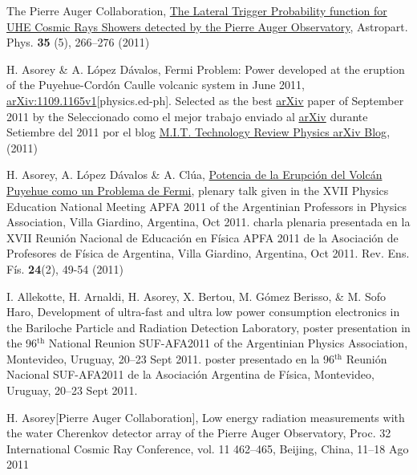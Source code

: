 \begin{etaremune}
\item {} The Pierre Auger Collaboration, 
\href{http://dx.doi.org/10.1016/j.astropartphys.2011.08.001}{{The Lateral
Trigger Probability function for UHE Cosmic Rays Showers detected by the Pierre
Auger Observatory}}, Astropart. Phys. {\bf{35}} (5), 266--276 (2011)

\item {}H. Asorey \& A. López Dávalos, {{Fermi Problem: Power
developed at the eruption of the Puyehue-Cordón Caulle volcanic system in June
2011}}, \href{http://arxiv.org/abs/1109.1165}{arXiv:1109.1165v1}[physics.ed-ph]. \ifeng
Selected as the best \href{http://arxiv.org}{arXiv} paper of September 2011 by the
\else
Seleccionado como el mejor trabajo enviado al \href{http://arxiv.org}{arXiv} durante Setiembre del 2011 por el blog 
\fi
\href{http://www.technologyreview.com/blog/arxiv/27140/}{M.I.T. Technology
Review Physics arXiv Blog}, (2011)

\item {}H. Asorey, A. López Dávalos \& A. Clúa, \href{https://dialnet.unirioja.es/servlet/articulo?codigo=4026852}{{Potencia de la Erupción del Volcán Puyehue como un Problema de Fermi}},
\ifeng
plenary talk given in the XVII Physics Education National Meeting APFA 2011 of the Argentinian Professors in Physics Association, Villa Giardino, Argentina, Oct 2011.
\else
charla plenaria presentada en la XVII Reunión Nacional de Educación en Física APFA 2011 de la Asociación de Profesores de Física de Argentina, Villa Giardino, Argentina, Oct 2011.
\fi
Rev. Ens. Fís. {\bf{24}}(2), 49-54 (2011)

\item {}I. Allekotte, H. Arnaldi, H. Asorey, X. Bertou, M. Gómez Berisso, \& M. Sofo Haro, {{Development of ultra-fast and ultra low power consumption electronics in the Bariloche Particle and Radiation Detection Laboratory}},
\ifeng
poster presentation in the 96$^{\mathrm{th}}$ National Reunion SUF-AFA2011 of the Argentinian Physics Association, Montevideo, Uruguay, 20--23 Sept 2011.
\else
poster presentado en la 96$^{\mathrm{th}}$ Reunión Nacional SUF-AFA2011 de la Asociación Argentina de Física, Montevideo, Uruguay, 20--23 Sept 2011.
\fi

\item {}H. Asorey[Pierre Auger Collaboration], {{Low energy radiation
measurements with the water Cherenkov detector array of the Pierre Auger
Observatory}}, \en Proc. 32 International Cosmic Ray Conference, vol. 11
462--465, Beijing, China, 11--18 Ago 2011


\end{etaremune}
